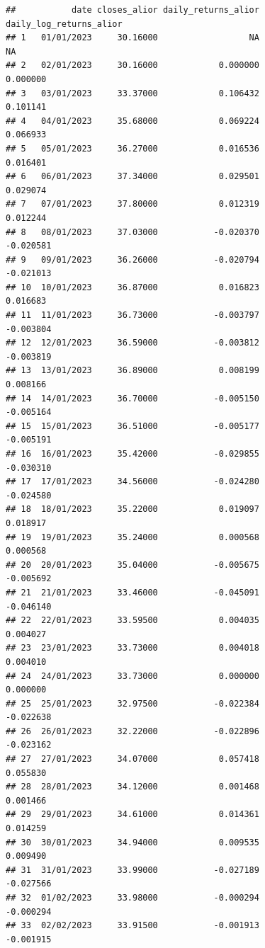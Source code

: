 \documentclass[
]{article}
\begin{document}
\begin{verbatim}
##           date closes_alior daily_returns_alior daily_log_returns_alior
## 1   01/01/2023     30.16000                  NA                      NA
## 2   02/01/2023     30.16000            0.000000                0.000000
## 3   03/01/2023     33.37000            0.106432                0.101141
## 4   04/01/2023     35.68000            0.069224                0.066933
## 5   05/01/2023     36.27000            0.016536                0.016401
## 6   06/01/2023     37.34000            0.029501                0.029074
## 7   07/01/2023     37.80000            0.012319                0.012244
## 8   08/01/2023     37.03000           -0.020370               -0.020581
## 9   09/01/2023     36.26000           -0.020794               -0.021013
## 10  10/01/2023     36.87000            0.016823                0.016683
## 11  11/01/2023     36.73000           -0.003797               -0.003804
## 12  12/01/2023     36.59000           -0.003812               -0.003819
## 13  13/01/2023     36.89000            0.008199                0.008166
## 14  14/01/2023     36.70000           -0.005150               -0.005164
## 15  15/01/2023     36.51000           -0.005177               -0.005191
## 16  16/01/2023     35.42000           -0.029855               -0.030310
## 17  17/01/2023     34.56000           -0.024280               -0.024580
## 18  18/01/2023     35.22000            0.019097                0.018917
## 19  19/01/2023     35.24000            0.000568                0.000568
## 20  20/01/2023     35.04000           -0.005675               -0.005692
## 21  21/01/2023     33.46000           -0.045091               -0.046140
## 22  22/01/2023     33.59500            0.004035                0.004027
## 23  23/01/2023     33.73000            0.004018                0.004010
## 24  24/01/2023     33.73000            0.000000                0.000000
## 25  25/01/2023     32.97500           -0.022384               -0.022638
## 26  26/01/2023     32.22000           -0.022896               -0.023162
## 27  27/01/2023     34.07000            0.057418                0.055830
## 28  28/01/2023     34.12000            0.001468                0.001466
## 29  29/01/2023     34.61000            0.014361                0.014259
## 30  30/01/2023     34.94000            0.009535                0.009490
## 31  31/01/2023     33.99000           -0.027189               -0.027566
## 32  01/02/2023     33.98000           -0.000294               -0.000294
## 33  02/02/2023     33.91500           -0.001913               -0.001915

\end{verbatim}
\end{document}
